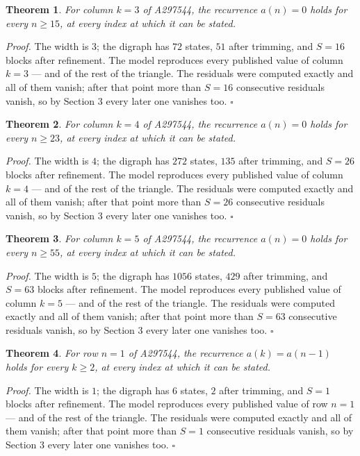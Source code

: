 \documentclass[11pt]{article}
\newtheorem{theorem}{Theorem}
\theoremstyle{definition}
\begin{document}
\begin{theorem} For column $k = 3$ of A297544, the recurrence $a(n) = 0$ holds for every $n \ge 15$, at every index at which it can be stated.\end{theorem}

{\itshape Proof.} The width is $3$; the digraph has $72$ states, $51$ after trimming, and $S = 16$ blocks after refinement. The model reproduces every published value of column $k = 3$ --- and of the rest of the triangle. The residuals were computed exactly and all of them vanish; after that point more than $S = 16$ consecutive residuals vanish, so by Section 3 every later one vanishes too. $\square$

\begin{theorem} For column $k = 4$ of A297544, the recurrence $a(n) = 0$ holds for every $n \ge 23$, at every index at which it can be stated.\end{theorem}

{\itshape Proof.} The width is $4$; the digraph has $272$ states, $135$ after trimming, and $S = 26$ blocks after refinement. The model reproduces every published value of column $k = 4$ --- and of the rest of the triangle. The residuals were computed exactly and all of them vanish; after that point more than $S = 26$ consecutive residuals vanish, so by Section 3 every later one vanishes too. $\square$

\begin{theorem} For column $k = 5$ of A297544, the recurrence $a(n) = 0$ holds for every $n \ge 55$, at every index at which it can be stated.\end{theorem}

{\itshape Proof.} The width is $5$; the digraph has $1056$ states, $429$ after trimming, and $S = 63$ blocks after refinement. The model reproduces every published value of column $k = 5$ --- and of the rest of the triangle. The residuals were computed exactly and all of them vanish; after that point more than $S = 63$ consecutive residuals vanish, so by Section 3 every later one vanishes too. $\square$

\begin{theorem} For row $n = 1$ of A297544, the recurrence $a(k) = a(n-1)$ holds for every $k \ge 2$, at every index at which it can be stated.\end{theorem}

{\itshape Proof.} The width is $1$; the digraph has $6$ states, $2$ after trimming, and $S = 1$ blocks after refinement. The model reproduces every published value of row $n = 1$ --- and of the rest of the triangle. The residuals were computed exactly and all of them vanish; after that point more than $S = 1$ consecutive residuals vanish, so by Section 3 every later one vanishes too. $\square$
\end{document}
